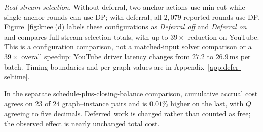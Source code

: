 \emph{Real-stream selection.}
Without deferral, two-anchor actions use min-cut while single-anchor rounds
can use DP; with deferral, all $2{,}079$ reported rounds use DP.
Figure~\ref{fig:knee}(d) labels these configurations as \emph{Deferral off}
and \emph{Deferral on} and compares full-stream selection totals, with up to
$39\times$ reduction on YouTube. This is a configuration comparison, not
a matched-input solver comparison or a $39\times$ overall speedup:
YouTube driver latency changes from $27.2$ to $26.9$\,ms per batch.
Timing boundaries and per-graph values are in Appendix~\ref{app:defer-seltime}.

In the separate schedule-plus-closing-balance comparison, cumulative accrual
cost agrees on $23$ of $24$ graph--instance pairs and is $0.01\%$ higher on
the last, with $Q$ agreeing to five decimals. Deferred work is charged rather
than counted as free; the observed effect is nearly unchanged total cost.
